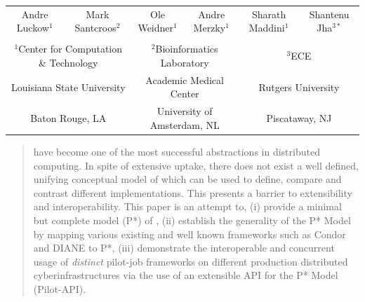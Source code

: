 \documentclass{sig-alternate}
\begin{document}
\date{}

\maketitle


\begin{minipage}[h]{\textwidth} 
\vspace{-6cm}
\begin{tabular}{cccccc}
Andre Luckow$^{1}$ &Mark Santcroos$^{2}$ &Ole Weidner$^{1}$ &Andre Merzky$^{1}$ &Sharath Maddini$^{1}$ &Shantenu Jha$^{3*}$\\

&&&&&\\

\multicolumn{2}{c}{$^1$Center for Computation \& Technology} &\multicolumn{2}{c}{$^{2}$Bioinformatics Laboratory} 
&\multicolumn{2}{c}{$^{3}$ECE}\\
\multicolumn{2}{c}{Louisiana State University} &\multicolumn{2}{c}{Academic Medical Center} &\multicolumn{2}{c}{Rutgers University}\\
\multicolumn{2}{c}{Baton Rouge, LA} &\multicolumn{2}{c}{University of Amsterdam, NL} &\multicolumn{2}{c}{Piscataway, NJ}\\
\end{tabular}
\end{minipage}


\let\thefootnote\relax{}

\vspace{-2cm}
\begin{abstract} 
  \pilotjobs have become one of the most successful abstractions in
  distributed computing. In spite of extensive uptake, there does not
  exist a well defined, unifying conceptual model of \pilotjobs which
  can be used to define, compare and contrast different
  implementations. This presents a barrier to extensibility and
  interoperability. This paper is an attempt to, (i) provide a minimal
  but complete model (P*) of \pilotjobs, (ii) establish the generality
  of the P* Model by mapping various existing and well known \pilotjob
  frameworks such as Condor and DIANE to P*, (iii) demonstrate the
  interoperable and concurrent usage of {\it distinct} pilot-job
  frameworks on different production distributed cyberinfrastructures
  via the use of an extensible API for the P* Model (Pilot-API).
\end{abstract}
\end{document}
